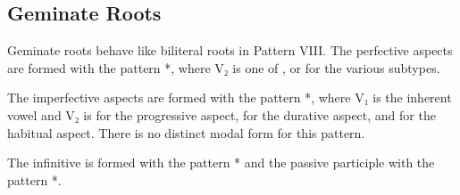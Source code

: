 \documentclass[grammar]{subfiles}
\begin{document}
\subsection{Geminate Roots}
\label{ssec:vm_viii_geminate_roots}

Geminate roots behave like biliteral roots in Pattern VIII.  The perfective
aspects are formed with the pattern *, where V₂ is one of ,
 or  for the various subtypes.  

The imperfective aspects are formed with the pattern *, where
V₁ is the inherent vowel and V₂ is  for the progressive aspect, 
for the durative aspect, and  for the habitual aspect.  There is no
distinct modal form for this pattern. 

The infinitive is formed with the pattern * and the passive
participle with the pattern *.  

\begin{table}[h!]\small\capstart
  \centering
  \\
  \caption{Pattern VIII geminate stems \label{tab:vm_viii_geminate_stems}}
\end{table}
\end{document}
